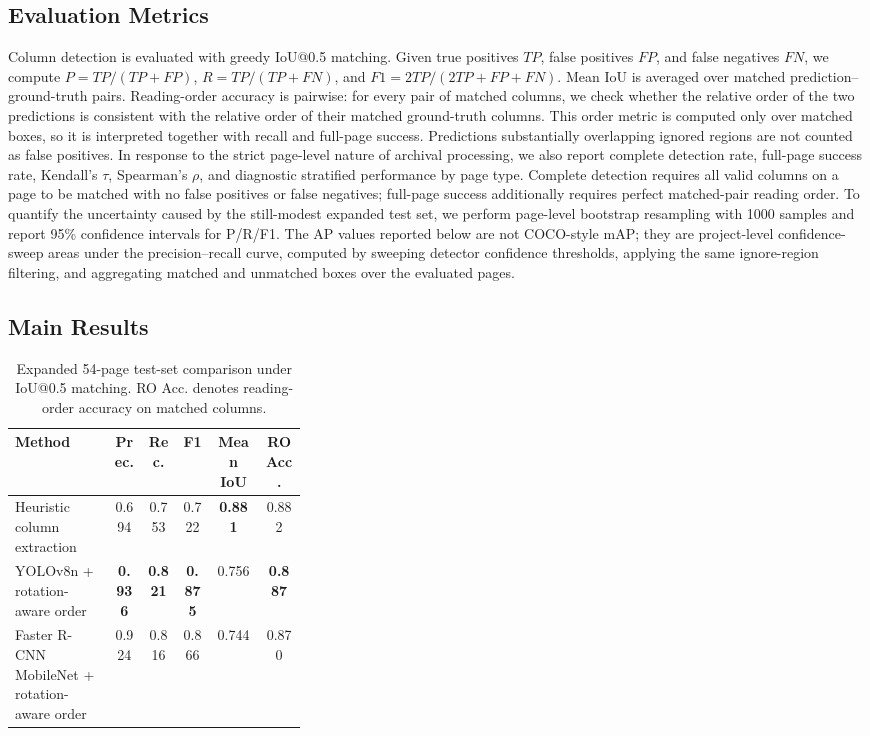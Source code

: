 \documentclass[12pt]{article}
\begin{document}
\subsection{Evaluation Metrics}
Column detection is evaluated with greedy IoU@0.5 matching. Given true positives $TP$, false positives $FP$, and false negatives $FN$, we compute $P=TP/(TP+FP)$, $R=TP/(TP+FN)$, and $F1=2TP/(2TP+FP+FN)$. Mean IoU is averaged over matched prediction--ground-truth pairs. Reading-order accuracy is pairwise: for every pair of matched columns, we check whether the relative order of the two predictions is consistent with the relative order of their matched ground-truth columns. This order metric is computed only over matched boxes, so it is interpreted together with recall and full-page success. Predictions substantially overlapping ignored regions are not counted as false positives. In response to the strict page-level nature of archival processing, we also report complete detection rate, full-page success rate, Kendall's $\tau$, Spearman's $\rho$, and diagnostic stratified performance by page type. Complete detection requires all valid columns on a page to be matched with no false positives or false negatives; full-page success additionally requires perfect matched-pair reading order. To quantify the uncertainty caused by the still-modest expanded test set, we perform page-level bootstrap resampling with 1000 samples and report 95\% confidence intervals for P/R/F1. The AP values reported below are not COCO-style mAP; they are project-level confidence-sweep areas under the precision--recall curve, computed by sweeping detector confidence thresholds, applying the same ignore-region filtering, and aggregating matched and unmatched boxes over the evaluated pages.

\subsection{Main Results}
\begin{table}[t]
\centering
\scriptsize\setlength{\tabcolsep}{3pt}
\caption{Expanded 54-page test-set comparison under IoU@0.5 matching. RO Acc. denotes reading-order accuracy on matched columns.}
\label{tab:main_results}
\begin{tabular}{p{0.34\linewidth}ccccc}
\toprule
Method & Prec. & Rec. & F1 & Mean IoU & RO Acc. \\
\midrule
Heuristic column extraction & 0.694 & 0.753 & 0.722 & \textbf{0.881} & 0.882 \\
YOLOv8n + rotation-aware order & \textbf{0.936} & \textbf{0.821} & \textbf{0.875} & 0.756 & \textbf{0.887} \\
Faster R-CNN MobileNet + rotation-aware order & 0.924 & 0.816 & 0.866 & 0.744 & 0.870 \\
\bottomrule
\end{tabular}
\end{table}
\end{document}
